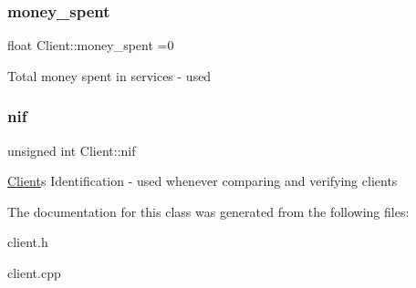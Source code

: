 \subsubsection{\texorpdfstring{money\+\_\+spent}{money\_spent}}
{\footnotesize\ttfamily float Client\+::money\+\_\+spent =0\hspace{0.3cm}{\ttfamily [protected]}}

Total money spent in services -\/ used \mbox{\label{class_client_a1c94dc96a56cb5032573fb1d528517c2}} 
\subsubsection{\texorpdfstring{nif}{nif}}
{\footnotesize\ttfamily unsigned int Client\+::nif\hspace{0.3cm}{\ttfamily [protected]}}

\hyperlink{class_client}{Client}\textquotesingle{}s Identification -\/ used whenever comparing and verifying clients 

The documentation for this class was generated from the following files\+:\begin{DoxyCompactItemize}
\item 
client.\+h\item 
client.\+cpp\end{DoxyCompactItemize}
